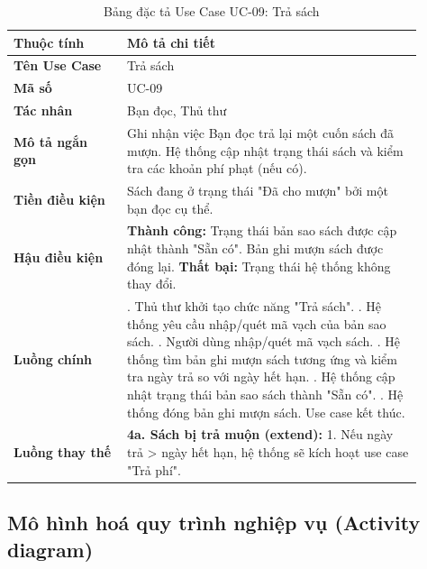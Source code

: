 \begin{table}[H]
\centering
\caption{Bảng đặc tả Use Case UC-09: Trả sách}
\label{tab:dt_tra_sach}
\begin{tabular}{|>{\raggedright\arraybackslash}p{0.25\linewidth}|>{\raggedright\arraybackslash}p{0.65\linewidth}|}
\hline
\textbf{Thuộc tính} & \textbf{Mô tả chi tiết} \\
\hline
\textbf{Tên Use Case} & Trả sách \\
\hline
\textbf{Mã số} & UC-09 \\
\hline
\textbf{Tác nhân} & Bạn đọc, Thủ thư \\
\hline
\textbf{Mô tả ngắn gọn} & Ghi nhận việc Bạn đọc trả lại một cuốn sách đã mượn. Hệ thống cập nhật trạng thái sách và kiểm tra các khoản phí phạt (nếu có). \\
\hline
\textbf{Tiền điều kiện} & Sách đang ở trạng thái "Đã cho mượn" bởi một bạn đọc cụ thể. \\
\hline
\textbf{Hậu điều kiện} & \textbf{Thành công:} Trạng thái bản sao sách được cập nhật thành "Sẵn có". Bản ghi mượn sách được đóng lại. \newline \textbf{Thất bại:} Trạng thái hệ thống không thay đổi. \\
\hline
\textbf{Luồng chính} &
1. Thủ thư khởi tạo chức năng "Trả sách". \newline
2. Hệ thống yêu cầu nhập/quét mã vạch của bản sao sách. \newline
3. Người dùng nhập/quét mã vạch sách. \newline
4. Hệ thống tìm bản ghi mượn sách tương ứng và kiểm tra ngày trả so với ngày hết hạn. \newline
5. Hệ thống cập nhật trạng thái bản sao sách thành "Sẵn có". \newline
6. Hệ thống đóng bản ghi mượn sách. Use case kết thúc. \\
\hline
\textbf{Luồng thay thế} &
\textbf{4a. Sách bị trả muộn (extend):} \newline
\hspace{1em} 1. Nếu ngày trả > ngày hết hạn, hệ thống sẽ kích hoạt use case "Trả phí". \\
\hline
\end{tabular}
\end{table}


\subsection{Mô hình hoá quy trình nghiệp vụ (Activity diagram)}
\label{subsec:ActivityDiagram}

